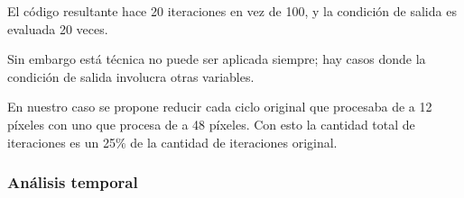 El código resultante hace 20 iteraciones en vez de 100, y la condición de salida es evaluada 20 veces.

Sin embargo está técnica no puede ser aplicada siempre; hay casos donde la condición de salida involucra otras variables.

En nuestro caso se propone reducir cada ciclo original que procesaba de a 12 píxeles con uno que procesa de a 48 píxeles. Con esto la cantidad total de iteraciones es un 25$\%$ de la cantidad de iteraciones original.
	
	\subsubsection{An\'alisis temporal}
	
	